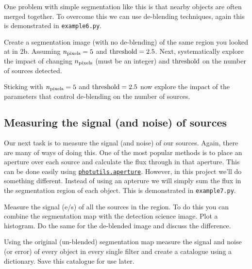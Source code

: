 \documentclass{article}
\begin{document}
One problem with simple segmentation like this is that nearby objects are often merged together. To overcome this we can use de-blending techniques, again this is demonstrated in \texttt{example6.py}.

\begin{question}
Create a segmentation image (with no de-blending) of the same region you looked at in 2b. Assuming $n_{\rm pixels} = 5$ and ${\rm threshold} = 2.5$. Next, systematically explore the impact of changing $n_{\rm pixels}$ (must be an integer) and ${\rm threshold}$ on the number of sources detected.
\end{question}


\begin{question}
Sticking with $n_{\rm pixels} = 5$ and ${\rm threshold} = 2.5$ now explore the impact of the parameters that control de-blending on the number of sources.
\end{question}


\subsection{Measuring the signal (and noise) of sources}


Our next task is to measure the signal (and noise) of our sources. Again, there are many of ways of doing this. One of the most popular methods is to place an aperture over each source and calculate the flux through in that aperture. This can be done easily using \href{https://photutils.readthedocs.io/en/stable/aperture.html}{\texttt{photutils.aperture}}. However, in this project we'll do something different. Instead of using an apterure we will simply sum the flux in the segmentation region of each object. This is demonstrated in \texttt{example7.py}.

\begin{question}
Measure the signal (e/s) of all the sources in the region. To do this you can combine the segmentation map with the detection science image. Plot a histogram. Do the same for the de-blended image and discuss the difference.
\end{question}

\begin{question}
Using the original (un-blended) segmentation map measure the signal and noise (or error) of every object in every single filter and create a catalogue using a dictionary. Save this catalogue for use later.
\end{question}
\end{document}
